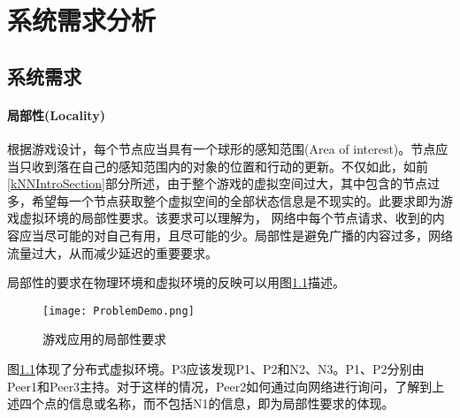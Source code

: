 % 
%
%
% 
%

\chapter{系统需求分析}
\label{AnalysisChapter}
\section{系统需求}
\setcounter{subsubsection}{0}
\subsubsection{局部性(Locality)}
\par
根据游戏设计，每个节点应当具有一个球形的感知范围(Area of interest)。节点应当只收到落在自己的感知范围内的对象的位置和行动的更新。不仅如此，如前\ref{kNNIntroSection}部分所述，由于整个游戏的虚拟空间过大，其中包含的节点过多，希望每一个节点获取整个虚拟空间的全部状态信息是不现实的。此要求即为游戏虚拟环境的局部性要求。该要求可以理解为， 网络中每个节点请求、收到的内容应当尽可能的对自己有用，且尽可能的少。局部性是避免广播的内容过多，网络流量过大，从而减少延迟的重要要求。
\par
局部性的要求在物理环境和虚拟环境的反映可以用图\ref{fig:Locality}描述。
\begin{figure}[h!]
	\centering
	\texttt{[image: ProblemDemo.png]}
	\caption{游戏应用的局部性要求}
	\label{fig:Locality}
\end{figure}
\par
图\ref{fig:Locality}体现了分布式虚拟环境。P3应该发现P1、P2和N2、N3。P1、P2分别由Peer1和Peer3主持。对于这样的情况，Peer2如何通过向网络进行询问，了解到上述四个点的信息或名称，而不包括N1的信息，即为局部性要求的体现。
